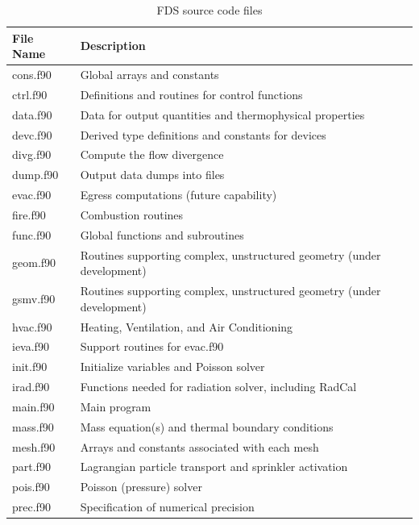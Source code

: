\documentclass[11pt]{book}
\begin{document}
\begin{table}[ht]
\begin{center}
\caption{FDS source code files}
\label{tab:sourcefiles}
\vspace{.1in}
\begin{tabular}{|l|l|}
\hline
File Name  & Description  \\ \hline \hline
{\ct cons.f90}   & Global arrays and constants \\ \hline
{\ct ctrl.f90}   & Definitions and routines for control functions \\ \hline
{\ct data.f90}   & Data for output quantities and thermophysical properties\\ \hline
{\ct devc.f90}   & Derived type definitions and constants for devices \\ \hline
{\ct divg.f90}   & Compute the flow divergence \\ \hline
{\ct dump.f90}   & Output data dumps into files \\ \hline
{\ct evac.f90}   & Egress computations (future capability) \\ \hline
{\ct fire.f90}   & Combustion routines \\ \hline
{\ct func.f90}   & Global functions and subroutines \\ \hline
{\ct geom.f90}   & Routines supporting complex, unstructured geometry (under development) \\ \hline
{\ct gsmv.f90}   & Routines supporting complex, unstructured geometry (under development) \\ \hline
{\ct hvac.f90}   & Heating, Ventilation, and Air Conditioning \\ \hline
{\ct ieva.f90}   & Support routines for evac.f90 \\ \hline
{\ct init.f90}   & Initialize variables and Poisson solver \\ \hline
{\ct irad.f90}   & Functions needed for radiation solver, including RadCal \\ \hline
{\ct main.f90}   & Main program \\ \hline
{\ct mass.f90}   & Mass equation(s) and thermal boundary conditions \\ \hline
{\ct mesh.f90}   & Arrays and constants associated with each mesh \\ \hline
{\ct part.f90}   & Lagrangian particle transport and sprinkler activation \\ \hline
{\ct pois.f90}   & Poisson (pressure) solver \\ \hline
{\ct prec.f90}   & Specification of numerical precision \\ \hline

\end{tabular}
\end{center}
\end{table}
\end{document}
